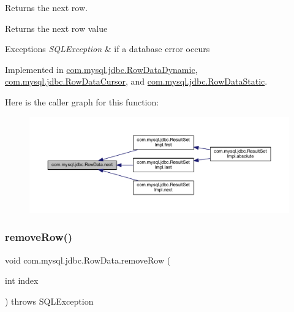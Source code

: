 Returns the next row.

\begin{DoxyReturn}{Returns}
the next row value 
\end{DoxyReturn}

\begin{DoxyExceptions}{Exceptions}
{\em S\+Q\+L\+Exception} & if a database error occurs \\
\hline
\end{DoxyExceptions}


Implemented in \mbox{\hyperlink{classcom_1_1mysql_1_1jdbc_1_1_row_data_dynamic_af940fe3daed4a966db30feb64581dfe6}{com.\+mysql.\+jdbc.\+Row\+Data\+Dynamic}}, \mbox{\hyperlink{classcom_1_1mysql_1_1jdbc_1_1_row_data_cursor_a10e57b268e86eaa793ecf951ee83a863}{com.\+mysql.\+jdbc.\+Row\+Data\+Cursor}}, and \mbox{\hyperlink{classcom_1_1mysql_1_1jdbc_1_1_row_data_static_ac220fe255287ae80ffb925828f4e4865}{com.\+mysql.\+jdbc.\+Row\+Data\+Static}}.

Here is the caller graph for this function\+:
\nopagebreak
\begin{figure}[H]
\begin{center}
\leavevmode
\includegraphics[width=350pt]{interfacecom_1_1mysql_1_1jdbc_1_1_row_data_a1984eb77a7be765f3da79a1e2349af59_icgraph}
\end{center}
\end{figure}
\mbox{\label{interfacecom_1_1mysql_1_1jdbc_1_1_row_data_ac60b2e20cd7043fb730f0977386e80be}} 
\subsubsection{\texorpdfstring{remove\+Row()}{removeRow()}}
{\footnotesize\ttfamily void com.\+mysql.\+jdbc.\+Row\+Data.\+remove\+Row (\begin{DoxyParamCaption}\item[{int}]{index }\end{DoxyParamCaption}) throws S\+Q\+L\+Exception}

